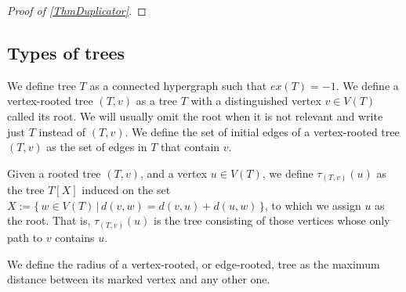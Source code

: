 \documentclass[12pt,notitlepage,a4paper]{article}
\theoremstyle{definition}
\begin{document}
\begin{proof}[Proof of \cref{ThmDuplicator}]
%		
%	
\end{proof}



\subsection{Types of trees}

We define tree $T$ as a connected hypergraph such that
$ex(T)=-1$. We define a vertex-rooted tree $(T,v)$ 
as a tree $T$ with a 
distinguished vertex $v\in V(T)$ called its root. We will
usually omit the root when it is not relevant and 
write just $T$ instead of $(T,v)$. We define the set
of initial edges of a vertex-rooted tree $(T,v)$ as the
set of edges in $T$ that contain $v$. \par
%
Given a rooted tree $(T, v)$, and a vertex $u\in V(T)$, 
we define $\tau_{(T,v)}(u)$ as the tree $T[X]$ induced on the
set $X:=\{ \, w\in V(T) \, | \, d(v,w)=d(v,u)+ d(u,w) \,  \}
$, to which we assign $u$ as the root.
That is, $\tau_{(T,v)}(u)$ is the tree consisting of those vertices
whose only path to $v$ contains $u$.
\par
We define the radius of a vertex-rooted, or edge-rooted,
tree as the maximum distance between its marked
vertex and any other one. \par
\end{document}
